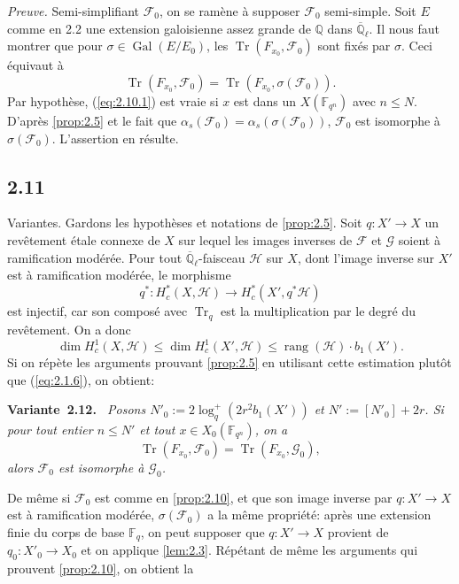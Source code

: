 \documentclass[11pt,a4paper]{article}
\makeatletter
\theoremstyle{plain}
\theoremstyle{definition}
\newenvironment{manualblock}[4]{%
  \par\medskip\noindent\textbf{#1~#2#3.}\def\@currentlabel{#2}\label{#4}\itshape\ }{\par\normalfont\medskip}
\DeclareMathOperator{\Gal}{Gal}
\DeclareMathOperator{\tr}{Tr}
\DeclareMathOperator{\rang}{rang}
\makeatother
\begin{document}
\noindent\textit{Preuve.} Semi-simplifiant $\mathcal{F}_0$, on se ram\`ene \`a supposer $\mathcal{F}_0$ semi-simple. Soit $E$ comme en 2.2 une extension galoisienne assez grande de $\mathbb{Q}$ dans $\overline{\mathbb{Q}}_\ell$. Il nous faut montrer que pour $\sigma \in \Gal(E/E_0)$, les $\tr(F_{x_0}, \mathcal{F}_0)$ sont fix\'es par $\sigma$. Ceci \'equivaut \`a
\begin{equation}\label{eq:2.10.1}
\tr(F_{x_0}, \mathcal{F}_0) = \tr(F_{x_0}, \sigma(\mathcal{F}_0)).
\end{equation}
Par hypoth\`ese, (\ref{eq:2.10.1}) est vraie si $x$ est dans un $X(\mathbb{F}_{q^n})$ avec $n \leq N$. D'apr\`es \ref{prop:2.5} et le fait que $\alpha_s(\mathcal{F}_0) = \alpha_s(\sigma(\mathcal{F}_0))$, $\mathcal{F}_0$ est isomorphe \`a $\sigma(\mathcal{F}_0)$. L'assertion en r\'esulte.

\subsection*{2.11}

Variantes. Gardons les hypoth\`eses et notations de \ref{prop:2.5}. Soit $q: X' \to X$ un rev\^etement \'etale connexe de $X$ sur lequel les images inverses de $\mathcal{F}$ et $\mathcal{G}$ soient \`a ramification mod\'er\'ee. Pour tout $\overline{\mathbb{Q}}_\ell$-faisceau $\mathcal{H}$ sur $X$, dont l'image inverse sur $X'$ est \`a ramification mod\'er\'ee, le morphisme
\[
q^*: H_c^*(X, \mathcal{H}) \to H_c^*(X', q^*\mathcal{H})
\]
est injectif, car son compos\'e avec $\tr_q$ est la multiplication par le degr\'e du rev\^etement. On a donc
\[
\dim H_c^1(X, \mathcal{H}) \leq \dim H_c^1(X', \mathcal{H}) \leq \rang(\mathcal{H}) \cdot b_1(X').
\]
Si on r\'ep\`ete les arguments prouvant \ref{prop:2.5} en utilisant cette estimation plut\^ot que (\ref{eq:2.1.6}), on obtient:

\begin{manualblock}{Variante}{2.12}{}{var:2.12}
Posons $N'_0 := 2\log_q^+(2r^2 b_1(X'))$ et $N' := [N'_0]+2r$. Si pour tout entier $n \leq N'$ et tout $x \in X_0(\mathbb{F}_{q^n})$, on a
\[
\tr(F_{x_0}, \mathcal{F}_0) = \tr(F_{x_0}, \mathcal{G}_0),
\]
alors $\mathcal{F}_0$ est isomorphe \`a $\mathcal{G}_0$.
\end{manualblock}

De m\^eme si $\mathcal{F}_0$ est comme en \ref{prop:2.10}, et que son image inverse par $q: X' \to X$ est \`a ramification mod\'er\'ee, $\sigma(\mathcal{F}_0)$ a la m\^eme propri\'et\'e: apr\`es une extension finie du corps de base $\mathbb{F}_q$, on peut supposer que $q: X' \to X$ provient de $q_0: X'_0 \to X_0$ et on applique \ref{lem:2.3}. R\'ep\'etant de m\^eme les arguments qui prouvent \ref{prop:2.10}, on obtient la
\end{document}
